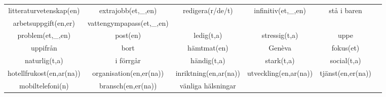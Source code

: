 \begin{center}
\begin{adjustwidth}{-2.4cm}{}
\begin{tabular}{|c c c c c c|}
            litteraturvetenskap(en) & extrajobb(et,\_,en) & redigera(r/de/t) & infinitiv(et,\_,en) & stå i baren &  \\
            arbetsuppgift(en,er) & vattengympapass(et,\_,en) &  &  &  &  \\
            problem(et,\_,en) & post(en) & ledig(t,a) & stressig(t,a) & uppe &  \\
            uppifrån & bort & hämtmat(en) & Gen\`eva & fokus(et) &  \\
            naturlig(t,a) & i förrgår & händig(t,a) & stark(t,a) & social(t,a) &  \\
            hotellfrukost(en,ar(na)) & organisation(en,er(na)) & inriktning(en,ar(na)) & utveckling(en,ar(na)) & tjänst(en,er(na)) &  \\
            mobiltelefoni(n) & bransch(en,er(na)) & vänliga hälsningar &  &  &  \\
            \hline
        \end{tabular}
    \end{adjustwidth}
\end{center}

